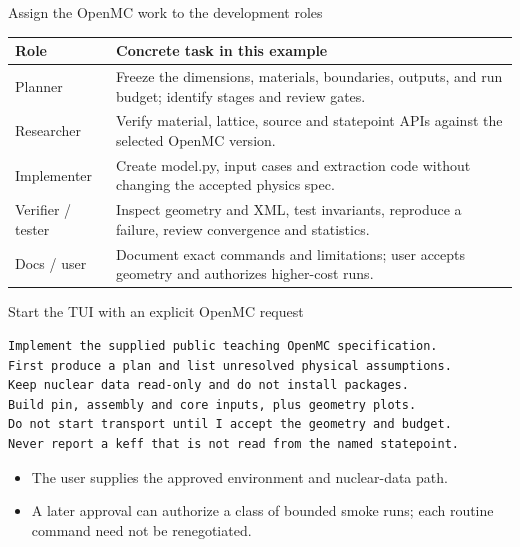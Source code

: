 \documentclass[aspectratio=169,11pt]{beamer}
\begin{document}
\begin{frame}[t,fragile]{Assign the OpenMC work to the development roles}
\fontsize{10.5}{12.5}\selectfont\setlength{\tabcolsep}{4pt}\renewcommand{\arraystretch}{1.15}
\begin{tabular}{>{\raggedright\arraybackslash}p{}>{\raggedright\arraybackslash}p{}}
\toprule
\textbf{Role} & \textbf{Concrete task in this example} \\ \midrule
Planner & Freeze the dimensions, materials, boundaries, outputs, and run budget; identify stages and review gates. \\[2pt]
Researcher & Verify material, lattice, source and statepoint APIs against the selected OpenMC version. \\[2pt]
Implementer & Create model.py, input cases and extraction code without changing the accepted physics spec. \\[2pt]
Verifier / tester & Inspect geometry and XML, test invariants, reproduce a failure, review convergence and statistics. \\[2pt]
Docs / user & Document exact commands and limitations; user accepts geometry and authorizes higher-cost runs. \\[2pt]
\bottomrule\end{tabular}\par\vspace{2mm}
\end{frame}
\begin{frame}[t,fragile]{Start the TUI with an explicit OpenMC request}
\begin{lstlisting}
Implement the supplied public teaching OpenMC specification.
First produce a plan and list unresolved physical assumptions.
Keep nuclear data read-only and do not install packages.
Build pin, assembly and core inputs, plus geometry plots.
Do not start transport until I accept the geometry and budget.
Never report a keff that is not read from the named statepoint.
\end{lstlisting}
\fontsize{10.5}{12.5}\selectfont
\begin{itemize}\setlength{\itemsep}{2mm}
\item The user supplies the approved environment and nuclear-data path.
\item A later approval can authorize a class of bounded smoke runs; each routine command need not be renegotiated.
\end{itemize}
\end{frame}
\end{document}

